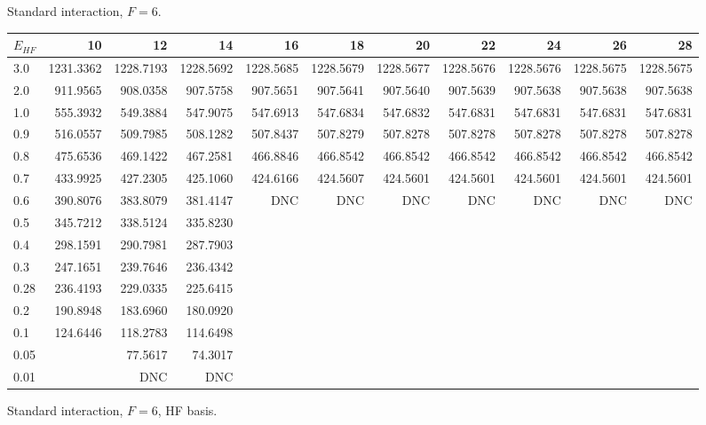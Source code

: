 \begin{landscape}
\begin{table}
\begin{center}
Standard interaction, $F=6$.\\
\begin{tabular}{l|rrrrrrrrrr}
\hline 
$E_{HF}$ & 10 & 12 & 14 & 16 & 18 & 20 & 22 & 24 & 26 & 28 \\
\hline \hline
3.0 & 1231.3362 & 1228.7193 & 1228.5692 & 1228.5685 & 1228.5679 & 1228.5677 & 1228.5676 &  1228.5676 & 1228.5675 & 1228.5675  \\ 
2.0 &  911.9565 &  908.0358 &  907.5758 &  907.5651 &  907.5641 &  907.5640 &  907.5639 &   907.5638 &  907.5638 &  907.5638  \\ 
1.0 &  555.3932 &  549.3884 &  547.9075 &  547.6913 &  547.6834 &  547.6832 &  547.6831 &   547.6831 &  547.6831 &  547.6831  \\ 
0.9 &  516.0557 &  509.7985 &  508.1282 &  507.8437 &  507.8279 &  507.8278 &  507.8278 &   507.8278 &  507.8278 &  507.8278  \\ 
0.8 &  475.6536 &  469.1422 &  467.2581 &  466.8846 &  466.8542 &  466.8542 &  466.8542 &   466.8542 &  466.8542 &  466.8542  \\ 
0.7 &  433.9925 &  427.2305 &  425.1060 &  424.6166 &  424.5607 &  424.5601 &  424.5601 &   424.5601 &  424.5601 &  424.5601  \\ 
0.6 &  390.8076 &  383.8079 &  381.4147 &       DNC &       DNC &       DNC &      DNC  &      DNC   &       DNC &       DNC  \\ 
0.5 & 345.7212 & 338.5124 & 335.8230  \\ 
0.4 & 298.1591 & 290.7981 & 287.7903  \\ 
0.3 & 247.1651 & 239.7646 & 236.4342  \\ 
0.28 & 236.4193 & 229.0335 & 225.6415  \\ 
0.2 & 190.8948 & 183.6960 & 180.0920  \\ 
0.1 & 124.6446 & 118.2783 & 114.6498  \\ 
0.05 &         & 77.5617 & 74.3017  \\ 
0.01 &         & DNC & DNC  \\ 
\hline \hline
\end{tabular}
\end{center}
\end{table}
\begin{table}
\begin{center}
Standard interaction, $F=6$, HF basis.\\

\end{center}
\end{table}
\end{landscape}
